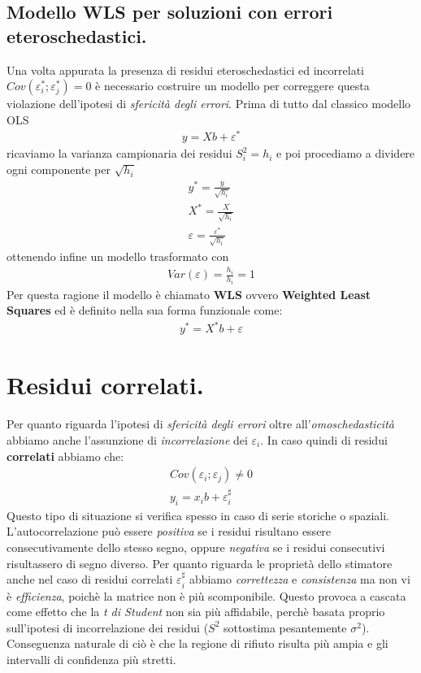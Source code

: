 \documentclass[11pt, twocolumn]{article}
\begin{document}
\subsection*{Modello WLS per soluzioni con errori eteroschedastici.}
Una volta appurata la presenza di residui eteroschedastici ed incorrelati $Cov(\varepsilon_i^*;\varepsilon_j^*) = 0$ è necessario costruire un modello per correggere questa violazione dell'ipotesi di \textit{sfericità degli errori}. Prima di tutto dal classico modello OLS 
\begin{align*}
y = Xb + \varepsilon^*
\end{align*}
ricaviamo la varianza campionaria dei residui $S^2_i = h_i$ e poi procediamo a dividere ogni componente per $\sqrt{h_i}$
\begin{align*}
y^* = \frac{y}{\sqrt{h_i}}\\
X^* = \frac{X}{\sqrt{h_i}}\\
\varepsilon = \frac{\varepsilon^*}{\sqrt{h_i}}
\end{align*}
ottenendo infine un modello trasformato con
\begin{align*}
Var(\varepsilon) = \frac{h_i}{h_i} = 1
\end{align*}
Per questa ragione il modello è chiamato \textbf{WLS} ovvero \textbf{Weighted Least Squares} ed è definito nella sua forma funzionale come:
\begin{align*}
y^* = X^*b + \varepsilon
\end{align*}
\section{Residui correlati.}
Per quanto riguarda l'ipotesi di \textit{sfericità degli errori} oltre all'\textit{omoschedasticità} abbiamo anche l'assunzione di \textit{incorrelazione} dei $\varepsilon_i$. In caso quindi di residui \textbf{correlati} abbiamo che:
\begin{align*}
Cov(\varepsilon_i;\varepsilon_j)\not = 0\\
y_i = x_i b + \varepsilon_i^\sharp
\end{align*}
Questo tipo di situazione si verifica spesso in caso di serie storiche o spaziali.
L'autocorrelazione può essere \textit{positiva} se i residui risultano essere consecutivamente dello stesso segno, oppure \textit{negativa} se i residui consecutivi risultassero di segno diverso.
Per quanto riguarda le proprietà dello stimatore anche nel caso di residui correlati $\varepsilon_i^\sharp$  abbiamo \textit{correttezza} e \textit{consistenza} ma non vi è \textit{efficienza}, poichè la matrice non è più scomponibile. Questo provoca a cascata come effetto che la \textit{t di Student} non sia più affidabile, perchè basata proprio sull'ipotesi di incorrelazione dei residui ($S^2$ sottostima pesantemente $\sigma^2$). Conseguenza naturale di ciò è che la regione di rifiuto risulta più ampia e gli intervalli di confidenza più stretti.
\end{document}
